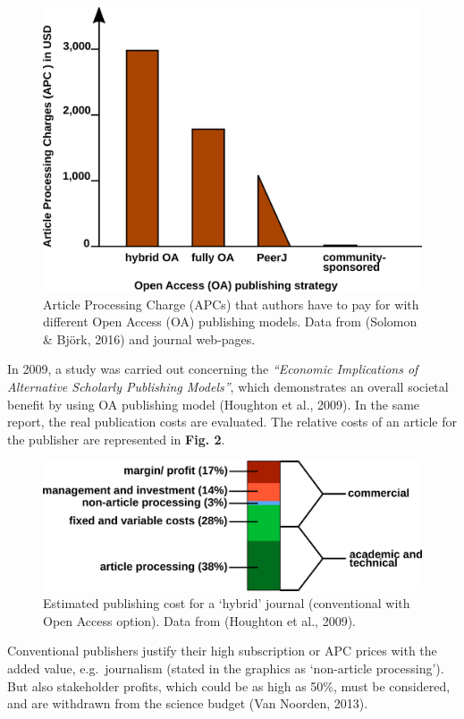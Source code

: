 \documentclass[10pt,fleqn]{wlpeerj}
\begin{document}
\begin{figure}[htbp]
\centering
\includegraphics{Fig1.png}
\caption{Article Processing Charge (APCs) that authors have to pay for
with different Open Access (OA) publishing models. Data from (Solomon \&
Björk, 2016) and journal web-pages.}
\end{figure}

In 2009, a study was carried out concerning the \emph{``Economic
Implications of Alternative Scholarly Publishing Models''}, which
demonstrates an overall societal benefit by using OA publishing model
(Houghton et al., 2009). In the same report, the real publication costs
are evaluated. The relative costs of an article for the publisher are
represented in \textbf{Fig. 2}.

\begin{figure}[htbp]
\centering
\includegraphics{Fig2.png}
\caption{Estimated publishing cost for a `hybrid' journal (conventional
with Open Access option). Data from (Houghton et al., 2009).}
\end{figure}

Conventional publishers justify their high subscription or APC prices
with the added value, e.g.~journalism (stated in the graphics as
`non-article processing'). But also stakeholder profits, which could be
as high as 50\%, must be considered, and are withdrawn from the science
budget (Van Noorden, 2013).
\end{document}
